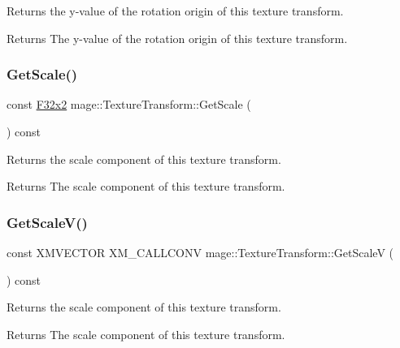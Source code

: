 Returns the y-\/value of the rotation origin of this texture transform.

\begin{DoxyReturn}{Returns}
The y-\/value of the rotation origin of this texture transform. 
\end{DoxyReturn}
\mbox{\label{classmage_1_1_texture_transform_a822d0aac9ada61b2e8df0949b28fbff1}} 
\subsubsection{\texorpdfstring{Get\+Scale()}{GetScale()}}
{\footnotesize\ttfamily const \mbox{\hyperlink{namespacemage_aee4759dedc8def6c6dec26b5c7eddf29}{F32x2}} mage\+::\+Texture\+Transform\+::\+Get\+Scale (\begin{DoxyParamCaption}{ }\end{DoxyParamCaption}) const\hspace{0.3cm}{\ttfamily [noexcept]}}

Returns the scale component of this texture transform.

\begin{DoxyReturn}{Returns}
The scale component of this texture transform. 
\end{DoxyReturn}
\mbox{\label{classmage_1_1_texture_transform_af8290a3e9db59677b9f2f217b464d625}} 
\subsubsection{\texorpdfstring{Get\+Scale\+V()}{GetScaleV()}}
{\footnotesize\ttfamily const X\+M\+V\+E\+C\+T\+OR X\+M\+\_\+\+C\+A\+L\+L\+C\+O\+NV mage\+::\+Texture\+Transform\+::\+Get\+ScaleV (\begin{DoxyParamCaption}{ }\end{DoxyParamCaption}) const\hspace{0.3cm}{\ttfamily [noexcept]}}

Returns the scale component of this texture transform.

\begin{DoxyReturn}{Returns}
The scale component of this texture transform. 
\end{DoxyReturn}
\mbox{\label{classmage_1_1_texture_transform_a8aba9997f667007fb9b77e14031a1f00}} 

